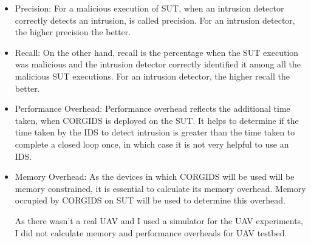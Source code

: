\begin{itemize}
\item Precision: For a malicious execution of SUT, when an intrusion detector correctly detects an intrusion, is called precision. For an intrusion detector, the higher precision the better.
\item Recall: On the other hand, recall is the percentage when the SUT execution was malicious and the intrusion detector correctly identified it among all the malicious SUT executions. For an intrusion detector, the higher recall the better.
\item Performance Overhead: Performance overhead reflects the additional time taken, when CORGIDS is deployed on the SUT. It helps to determine if the time taken by the IDS to detect intrusion is greater than the time taken to complete a closed loop once, in which case it is not very helpful to use an IDS.
\item Memory Overhead: As the devices in which CORGIDS will be used will be memory constrained, it is essential to calculate its memory overhead. Memory occupied by CORGIDS on SUT will be used to determine this overhead.

As there wasn't a real UAV and I used a simulator for the UAV experiments, I did not calculate memory and performance overheads for UAV testbed.
\end{itemize}


\begin{table}
\centering
  \caption{False Positives and False Negatives obtained for CORGIDS on the two test-beds}
  \label{tab:results}
\end{table}


